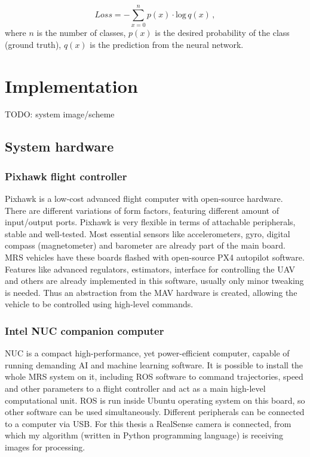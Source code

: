 \begin{equation}
	Loss = -\sum\limits_{x=0}^n p(x)\cdot \textrm{log} \,q(x) \,,
\end{equation}
where $n$ is the number of classes, $p(x)$ is the desired probability of the class (ground truth), $q(x)$ is the prediction from the neural network.




\chapter{Implementation}

TODO: system image/scheme

\section{System hardware}

\subsection{Pixhawk flight controller}

Pixhawk is a low-cost advanced flight computer with open-source hardware. There are different variations of form factors, featuring different amount of input/output ports. Pixhawk is very flexible in terms of attachable peripherals, stable and well-tested. Most essential sensors like accelerometers, gyro, digital compass (magnetometer) and barometer are already part of the main board. \acs{MRS} vehicles have these boards flashed with open-source PX4 autopilot software. Features like advanced regulators, estimators, interface for controlling the \acs{UAV} and others are already implemented in this software, usually only minor tweaking is needed. Thus an abstraction from the \acs{MAV} hardware is created, allowing the vehicle to be controlled using high-level commands.


\subsection{Intel NUC companion computer}

NUC is a compact high-performance, yet power-efficient computer, capable of running demanding AI and machine learning software. It is possible to install the whole \acs{MRS} system on it, including \acs{ROS} software to command trajectories, speed and other parameters to a flight controller and act as a main high-level computational unit. \acs{ROS} is run inside Ubuntu operating system on this board, so other software can be used simultaneously. Different peripherals can be connected to a computer via \acs{USB}. For this thesis a RealSense camera is connected, from which my algorithm (written in Python programming language) is receiving images for processing.

